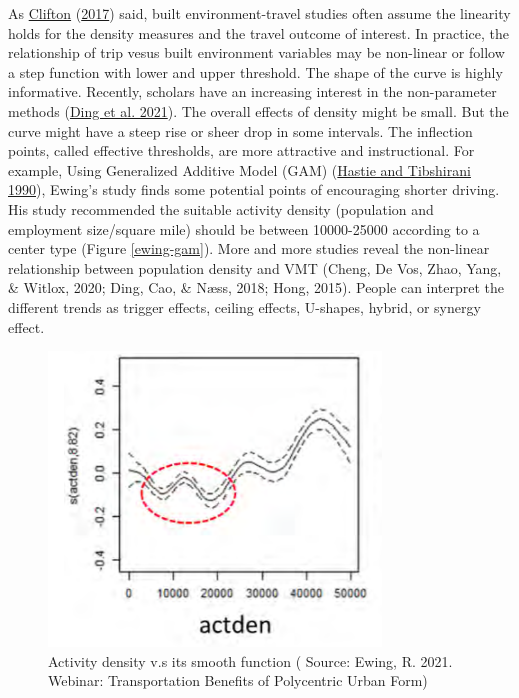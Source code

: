 \documentclass[
  11pt,
  openany]{memoir}
\begin{document}
As \protect\hyperlink{ref-cliftonGettingHereThere2017}{Clifton} (\protect\hyperlink{ref-cliftonGettingHereThere2017}{2017}) said, built environment-travel studies often assume the linearity holds for the density measures and the travel outcome of interest. In practice, the relationship of trip vesus built environment variables may be non-linear or follow a step function with lower and upper threshold. The shape of the curve is highly informative. Recently, scholars have an increasing interest in the non-parameter methods (\protect\hyperlink{ref-dingNonlinearAssociationsZonal2021}{Ding et al. 2021}). The overall effects of density might be small. But the curve might have a steep rise or sheer drop in some intervals. The inflection points, called effective thresholds, are more attractive and instructional. For example, Using Generalized Additive Model (GAM) (\protect\hyperlink{ref-hastieGeneralizedAdditiveModels1990}{Hastie and Tibshirani 1990}), Ewing's study finds some potential points of encouraging shorter driving. His study recommended the suitable activity density (population and employment size/square mile) should be between 10000-25000 according to a center type (Figure \ref{ewing-gam}).
More and more studies reveal the non-linear relationship between population density and VMT (Cheng, De Vos, Zhao, Yang, \& Witlox, 2020; Ding, Cao, \& Næss, 2018; Hong, 2015).
People can interpret the different trends as trigger effects, ceiling effects, U-shapes, hybrid, or synergy effect.

\begin{figure}

{\centering \includegraphics[width=0.5\linewidth]{fig/Ewing_gam1} 

}

\caption{Activity density v.s its smooth function ( Source: Ewing, R. 2021. Webinar: Transportation Benefits of Polycentric Urban Form)}\label{fig:ewing-gam}
\end{figure}
\end{document}
